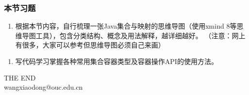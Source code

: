 \begin{frame}[fragile]
  \frametitle{本节习题}

  \begin{enumerate}
  \item 根据本节内容，自行梳理一张Java集合与映射的思维导图（使用xmind
    8等思维导图工具），包含分类结构、概念及用法解释，越详细越好。{\kai
      （注意：网上有很多，大家可以参考但思维导图必须自己来画）}
  \end{enumerate}
  
  
  \begin{enumerate}
  \item 写代码学习掌握各种常用集合容器类型及容器操作API的使用方法。
  \end{enumerate}

\end{frame}
\begin{frame}[focus]
  \centering
  {\Huge {THE END}} \\
  \vspace{5mm}
  {\Large wangxiaodong@ouc.edu.cn} \\
\end{frame}
